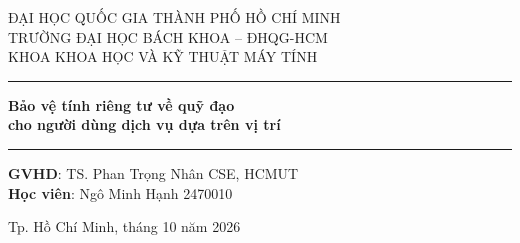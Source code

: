 \documentclass[12pt,a4paper,oneside]{report}
\begin{document}
\hypersetup{pageanchor=false}

\begin{titlepage}
\centering
{\large ĐẠI HỌC QUỐC GIA THÀNH PHỐ HỒ CHÍ MINH\\
TRƯỜNG ĐẠI HỌC BÁCH KHOA -- ĐHQG-HCM\\
KHOA KHOA HỌC VÀ KỸ THUẬT MÁY TÍNH\par}
\vspace{3.6cm}
\rule{0.72\textwidth}{0.4pt}\par
\vspace{0.8cm}
{\bfseries\LARGE Bảo vệ tính riêng tư về quỹ đạo\\
cho người dùng dịch vụ dựa trên vị trí\par}
\vspace{0.8cm}
\rule{0.72\textwidth}{0.4pt}\par
\vspace{2.7cm}
\begin{flushleft}
\hspace{2cm}\textbf{GVHD}: TS. Phan Trọng Nhân \hfill CSE, HCMUT\hspace{2cm}\mbox{}\\[6pt]
\hspace{2cm}\textbf{Học viên}: Ngô Minh Hạnh \hfill 2470010\hspace{2cm}\mbox{}
\end{flushleft}
\vfill
{Tp. Hồ Chí Minh, tháng 10 năm 2026\par}
\end{titlepage}

\hypersetup{pageanchor=true}
\begingroup
\small
{}
\setlength{\parskip}{0pt}
\tableofcontents
\endgroup
\begingroup
\small
{}
\setlength{\parskip}{0pt}
\listoffigures
\listoftables
\endgroup
\end{document}

